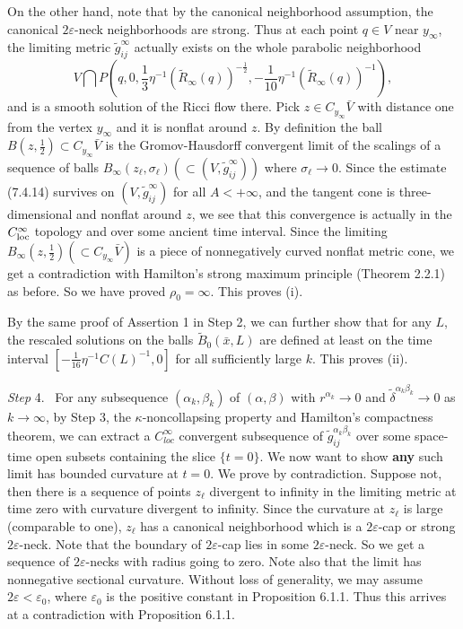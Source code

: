 On the other hand, note that by the canonical neighborhood
assumption, the canonical $2\varepsilon$-neck neighborhoods are
strong. Thus at each point $q\in V$ near $y_{\infty}$, the
limiting metric $\widetilde{g}^{\infty}_{ij}$ actually exists on
the whole parabolic neighborhood
$$
V \bigcap
P\left(q,0,\frac{1}{3}\eta^{-1}(\widetilde{R}_{\infty}(q))^{-\frac{1}{2}},
-\frac{1}{10}\eta^{-1}(\widetilde{R}_{\infty}(q))^{-1}\right),
$$
and is a smooth solution of the Ricci flow there. Pick $z\in
C_{y_{\infty}}\bar{V}$ with distance one from the vertex
$y_{\infty}$ and it is nonflat around $z$. By definition the ball
$B(z,\frac{1}{2})\subset C_{y_{\infty}}\bar{V}$ is the
Gromov-Hausdorff convergent limit of the scalings of a sequence of
balls $B_{\infty}(z_{\ell},\sigma_{\ell})
(\subset(V,\widetilde{g}^{\infty}_{ij}))$ where
$\sigma_{\ell}\rightarrow0$. Since the estimate (7.4.14) survives
on $(V,\widetilde{g}^{\infty}_{ij})$ for all $A < +\infty$, and
the tangent cone is three-dimensional and nonflat around $z$, we
see that this convergence is actually in the $C^{\infty}_{\rm
loc}$ topology and over some ancient time interval. Since the
limiting $B_{\infty}(z,\frac{1}{2})(\subset
C_{y_{\infty}}\bar{V})$ is a piece of nonnegatively curved nonflat
metric cone, we get a contradiction with Hamilton's strong maximum
principle (Theorem 2.2.1) as before. So we have proved
$\rho_0=\infty$. This proves (i).

By the same proof of Assertion 1 in Step 2, we can further show
that for any $L$, the rescaled solutions on the balls
$\tilde{B}_{0}(\bar{x},L)$ are defined at least on the time
interval $[-\frac{1}{16}\eta^{-1}C(L)^{-1},0]$ for all
sufficiently large $k$. This proves (ii).

\medskip
{\it Step} 4. \ For any subsequence $(\alpha_k,\beta_k)$ of
$(\alpha,\beta)$ with $r^{\alpha_k}\rightarrow 0$ and
$\widetilde{\delta}^{\alpha_k\beta_k}\rightarrow 0$ as
$k\rightarrow \infty$, by Step 3, the $\kappa$-noncollapsing
property and Hamilton's compactness theorem, we can extract a
$C^{\infty}_{loc}$ convergent subsequence of
$\tilde{g}^{\alpha_k\beta_k}_{ij}$ over some space-time open
subsets containing the slice $\{t=0\}$. We now want to show
\textbf{any} such limit has bounded curvature at $t=0$. We prove
by contradiction. Suppose not, then there is a sequence of points
$z_{\ell}$ divergent to infinity in the limiting metric at time
zero with curvature divergent to infinity. Since the curvature at
$z_{\ell}$ is large (comparable to one), $z_{\ell}$ has a
canonical neighborhood which is a $2\varepsilon$-cap or strong
$2\varepsilon$-neck. Note that the boundary of $2\varepsilon$-cap
lies in some $2\varepsilon$-neck. So we get a sequence of
$2\varepsilon$-necks with radius going to zero. Note also that the
limit has nonnegative sectional curvature. Without loss of
generality, we may assume $2\varepsilon < \varepsilon_0$, where
$\varepsilon_0$ is the positive constant in Proposition 6.1.1.
Thus this arrives at a contradiction with Proposition 6.1.1.

